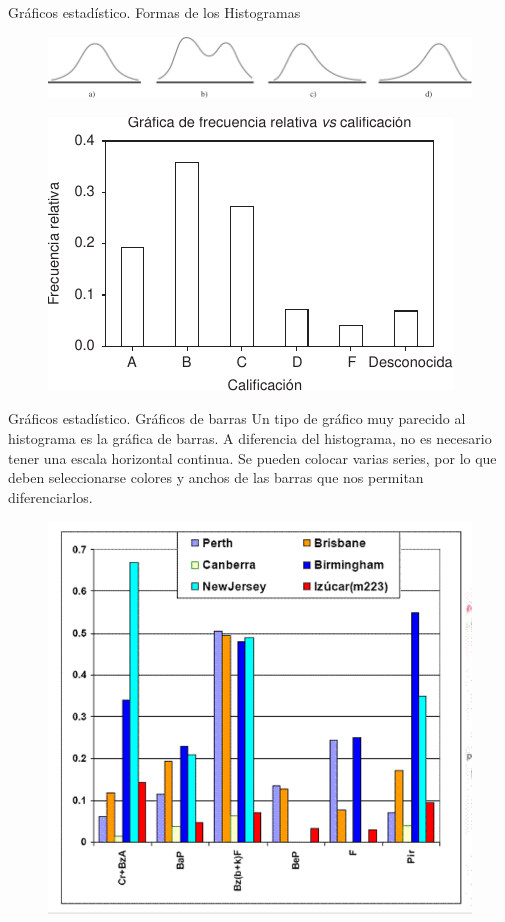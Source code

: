 \documentclass[11pt]{beamer}
\begin{document}
       \begin{frame}{Gráficos estadístico. Formas de los Histogramas }
         \begin{figure}
             \centering
             \includegraphics[width=0.7\linewidth]{images/formas_histograma}
             \label{fig:formashistograma}
         \end{figure}
         \pause
         \begin{figure}
             \centering
             \includegraphics[width=0.7\linewidth]{images/cualitativo_histograma}
             \caption{}
             \label{fig:cualitativohistograma}
         \end{figure}


      \end{frame}




      \begin{frame}{Gráficos estadístico. Gráficos de barras}
          Un tipo de gráfico muy parecido al histograma es la gráfica de barras.   A diferencia del histograma, no es necesario tener una escala horizontal continua. Se pueden colocar varias series, por lo que deben seleccionarse colores y anchos de las barras que nos permitan diferenciarlos.
          \begin{figure}
              \centering
              \includegraphics[width=0.5\linewidth]{images/graficos_barra1}
              \label{fig:graficosbarra1}
          \end{figure}
      \end{frame}
\end{document}
